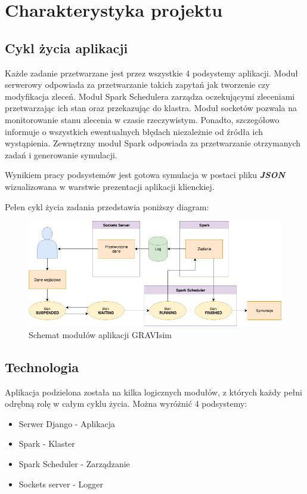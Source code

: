 \documentclass[a4paper,onecolumn,oneside,12pt]{memoir}
\begin{document}
{\chapter{Charakterystyka projektu}
\section{Cykl życia aplikacji}
\quad \quad Każde zadanie przetwarzane jest przez wszystkie 4 podsystemy aplikacji. Moduł serwerowy
odpowiada za przetwarzanie takich zapytań jak tworzenie czy modyfikacja zleceń.
Moduł Spark Schedulera zarządza oczekującymi zleceniami przetwarzając ich stan
oraz przekazując do klastra. Moduł socketów pozwala na monitorowanie stanu zlecenia
w czasie rzeczywistym. Ponadto, szczegółowo informuje o wszystkich ewentualnych błędach
niezależnie od źródła ich wystąpienia. Zewnętrzny moduł Spark odpowiada za przetwarzanie
otrzymanych zadań i generowanie symulacji.

Wynikiem pracy podsystemów jest gotowa symulacja w postaci pliku \textbf{\textit{JSON}} wizualizowana
w warstwie prezentacji aplikacji klienckiej.

Pełen cykl życia zadania przedstawia poniższy diagram:

\begin{figure}[h]
	\centering
	\includegraphics[width=1\linewidth]{lifecycle}
	\caption{Schemat modułów aplikacji GRAVIsim}
	\label{fig:stronaTytulowa}
\end{figure}
\pagebreak
\vspace*{1mm}
\section{Technologia}
\quad \quad Aplikacja podzielona została na kilka logicznych modułów, z których każdy pełni odrębną
rolę w całym cyklu życia. Można wyróżnić 4 podsystemy:
\begin{itemize}
\item Serwer Django - Aplikacja
\item Spark - Klaster
\item Spark Scheduler - Zarządzanie
\item Sockets server - Logger
\end{itemize}

}
\end{document}
